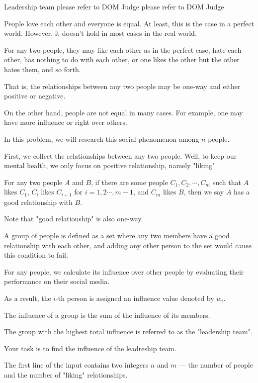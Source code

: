 \gdef\thisproblemauthor{}
\gdef\thisproblemdeveloper{}
\gdef\thisproblemorigin{}
\begin{problem}{Leadership team}
{}{}
{please refer to DOM Judge}
{please refer to DOM Judge}
{}

People love each other and everyone is equal. At least, this is the case in a perfect world. However, it doesn't hold in most cases in the real world.

For any two people, they may like each other as in the perfect case, hate each other, has nothing to do with each other, or one likes the other but the other hates them, and so forth.

That is, the relationships between any two people may be one-way and either positive or negative.

On the other hand, people are not equal in many cases. For example, one may have more influence or right over others.

In this problem, we will research this social phenomenon among $n$ people.

First, we collect the relationships between any two people. Well, to keep our mental health, we only focus on positive relationship, namely "liking".

For any two people $A$ and $B$, if there are some people $C_1, C_2,\cdots, C_m$ such that $A$ likes $C_1$, $C_i$ likes $C_{i+1}$ for $i=1, 2\cdots, m - 1$, and $C_m$ likes $B$, then we say $A$ has a good relationship with $B$.

Note that "good relationship" is also one-way.

A group of people is defined as a set where any two members have a good relationship with each other, and adding any other person to the set would cause this condition to fail.

For any people, we calculate its influence over other people by evaluating their performance on their social media.

As a result, the $i$-th person is assigned an influence value denoted by $w_i$.

The influence of a group is the sum of the influence of its members.

The group with the highest total influence is referred to as the "leadership team".

Your task is to find the influence of the leadreship team.

\InputFile

The first line of the input contains two integers $n$ and $m$ --- the number of people and the number of "liking" relationships.


\end{problem}
